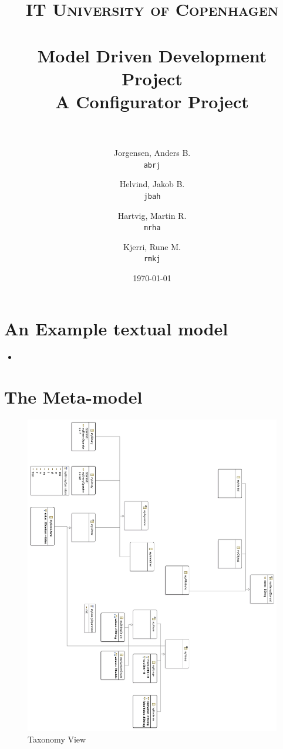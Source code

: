 \documentclass[paper=a4, fontsize=11pt]{scrartcl} %
\title{	
\normalfont \normalsize 
\textsc{IT University of Copenhagen} \\ [25pt] %
\horrule{0.5pt} \\[0.4cm] %
\huge Model Driven Development Project \\ %
\large A Configurator Project \\ %
\horrule{2pt} \\[0.5cm] %
}
\author{
  Jorgensen, Anders B.\\
  \texttt{abrj}
  \and
  Helvind, Jakob B.\\
  \texttt{jbah}
  \and
  Hartvig, Martin R.\\
  \texttt{mrha}
  \and
  Kjerri, Rune M.\\
  \texttt{rmkj}
}
\date{\normalsize\today} %
\numberwithin{equation}{section} %
\numberwithin{figure}{section} %
\numberwithin{table}{section} %
\newcommand{\java}[2]{
\begin{itemize}
\item[]
\end{itemize}
}
\begin{document}
\maketitle %
\newpage


\section{An Example textual model}
\java{../configproject/runtime-CarFactory/src/factory.smdpdsl}{Concrete syntax}

\section{The Meta-model}
\begin{figure}[ht!]
\centering
\includegraphics[scale=0.7]{pictures/taxView.png}
\caption{Taxonomy View}
\end{figure}
\end{document}
